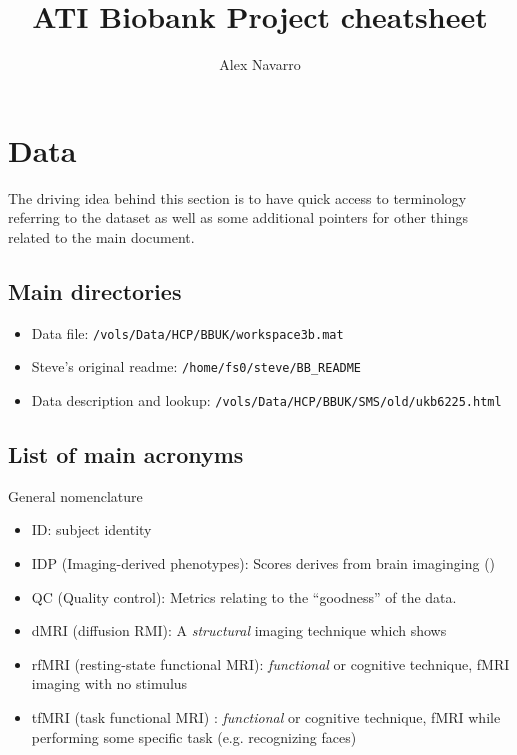 \documentclass{article}
\begin{document}
\title{ATI Biobank Project cheatsheet}

\author{Alex Navarro}

\maketitle

\section{Data\label{sec:data}}
The driving idea behind this section is to have quick access to terminology referring to the dataset as well as some additional pointers for other things related to the main document.

\subsection{Main directories\label{sec:data-dir}}

\begin{itemize}
\item Data file: {\tt /vols/Data/HCP/BBUK/workspace3b.mat}
\item Steve's original readme: {\tt /home/fs0/steve/BB\_README}
\item Data description and lookup: {\tt /vols/Data/HCP/BBUK/SMS/old/ukb6225.html}
\end{itemize}

\subsection{List of main acronyms\label{sec:data-acro}}

General nomenclature
\begin{itemize}
\item ID: subject identity
\item IDP (Imaging-derived phenotypes): Scores derives from brain imaginging ()
\item QC (Quality control): Metrics relating to the ``goodness'' of the data.
\item dMRI (diffusion RMI): A \emph{structural} imaging technique which shows
\item rfMRI (resting-state functional MRI): \emph{functional} or cognitive technique, fMRI imaging with no stimulus
\item tfMRI (task functional MRI) : \emph{functional} or cognitive technique, fMRI while performing some specific task (e.g. recognizing faces)
\end{itemize}
\end{document}
